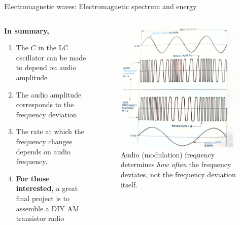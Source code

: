 \documentclass{beamer}
\begin{document}
\begin{frame}{Electromagnetic waves: Electromagnetic spectrum and energy}
\begin{columns}
\begin{column}{0.5\textwidth}
\small
\textbf{\alert{In summary,}}
\begin{enumerate}
\item The $C$ in the LC oscillator can be made to depend on audio amplitude
\item The audio amplitude corresponds to the frequency deviation
\item The rate at which the frequency changes depends on audio frequency.
\item \textbf{For those interested,} a great final project is to assemble a DIY AM transistor radio
\end{enumerate}
\end{column}
\begin{column}{0.5\textwidth}
\begin{figure}
\centering
\includegraphics[width=0.95\textwidth]{figures/FMSpec4.pdf}
\caption{\label{fig:radio4} \footnotesize Audio (modulation) frequency determines \textit{how often} the frequency deviates, not the frequency deviation itself.}
\end{figure}
\end{column}
\end{columns}
\end{frame}
\end{document}
